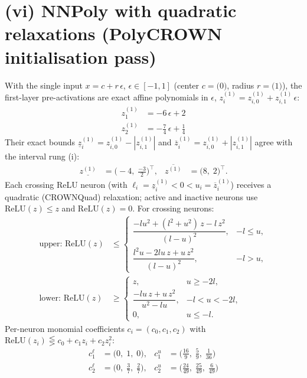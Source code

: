 \documentclass[11pt]{article}
\begin{document}
\section{(vi) NNPoly with quadratic relaxations (PolyCROWN initialisation pass)}
With the single input $x = c + r\,\epsilon$, $\epsilon \in [-1, 1]$ (center $c = \bigl(0\bigr)$, radius $r = \bigl(1\bigr)$), the first-layer pre-activations are exact affine polynomials in $\epsilon$, $z^{(1)}_i = z^{(1)}_{i,0} + z^{(1)}_{i,1}\,\epsilon$:
\begin{align*}
z^{(1)}_{1} &= -6\,\epsilon + 2 \\
z^{(1)}_{2} &= -\frac{7}{4}\,\epsilon + \frac{1}{4}
\end{align*}
Their exact bounds $\underline{z}^{(1)}_i = z^{(1)}_{i,0} - |z^{(1)}_{i,1}|$ and $\overline{z}^{(1)}_i = z^{(1)}_{i,0} + |z^{(1)}_{i,1}|$ agree with the interval rung (i):
\begin{align*}
\underline{z^{(1)}} &= \bigl(-4,\; \frac{-3}{2}\bigr)^{\!\top}, & \overline{z^{(1)}} &= \bigl(8,\; 2\bigr)^{\!\top}.
\end{align*}
Each crossing ReLU neuron (with $\ell_i = \underline{z}^{(1)}_i < 0 < u_i = \overline{z}^{(1)}_i$)
receives a quadratic (CROWNQuad) relaxation; active and inactive neurons use $\mathrm{ReLU}(z) \le z$
and $\mathrm{ReLU}(z) = 0$. For crossing neurons:
\begin{align*}
\text{upper: } \mathrm{ReLU}(z) &\le \begin{cases} \dfrac{-l u^2 + (l^2 + u^2)\, z - l\, z^2}{(l - u)^2}, & -l \le u, \\[3mm] \dfrac{l^2 u - 2 l u\, z + u\, z^2}{(l - u)^2}, & -l > u, \end{cases} \\[2mm]
\text{lower: } \mathrm{ReLU}(z) &\ge \begin{cases} z, & u \ge -2l, \\[3mm] \dfrac{-l u\, z + u\, z^2}{u^2 - l u}, & -l < u < -2l, \\[3mm] 0, & u \le -l. \end{cases}
\end{align*}
Per-neuron monomial coefficients $c_i = (c_0, c_1, c_2)$ with $\mathrm{ReLU}(z_i) \lesseqgtr c_0 + c_1 z_i + c_2 z_i^2$:
\begin{align*}
c^{\ell}_{1} &= \bigl(0,\; 1,\; 0\bigr), & c^{u}_{1} &= \bigl(\frac{16}{9},\; \frac{5}{9},\; \frac{1}{36}\bigr) \\
c^{\ell}_{2} &= \bigl(0,\; \frac{3}{7},\; \frac{2}{7}\bigr), & c^{u}_{2} &= \bigl(\frac{24}{49},\; \frac{25}{49},\; \frac{6}{49}\bigr)
\end{align*}
\end{document}
